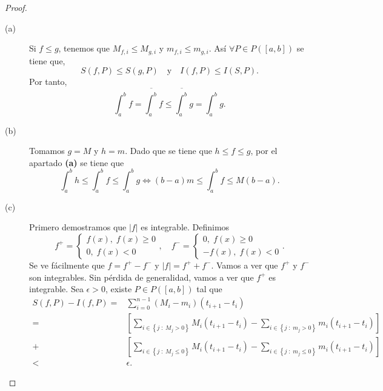\begin{proof}
\begin{description}
	\item[(a)] Si $\displaystyle f \leq g $, tenemos que $\displaystyle M_{f,i} \leq M_{g,i} $ y $\displaystyle m_{f,i} \leq m_{g,i} $. Así $\displaystyle \forall P \in P\left(\left[a,b\right] \right) $ se tiene que,
	\[ S\left(f,P\right) \leq S\left(g,P\right) \quad \text{y} \quad I\left(f,P\right) \leq I\left(S,P\right) .\]
	Por tanto, 
	\[ \int^{b}_{a} f = \overline{\int^{b}_{a}} f \leq \overline{\int^{b}_{a}} g = \int^{b}_{a} g  .\]
\item[(b)] Tomamos $\displaystyle g = M $ y $\displaystyle h = m $. Dado que se tiene que $\displaystyle h \leq f \leq g $, por el apartado \textbf{(a)} se tiene que 
	\[ \int^{b}_{a} h \leq \int^{b}_{a} f \leq \int^{b}_{a} g  \iff \left(b-a\right)m \leq \int^{b}_{a} f \leq M\left(b-a\right).\]
\item[(c)] Primero demostramos que $\displaystyle \left|f\right| $ es integrable. Definimos
	\[f^{+} = 
	\begin{cases}
	f\left(x\right), \; f\left(x\right) \geq 0 \\
	0, \; f\left(x\right) < 0
	\end{cases}
	, \quad f^{-} = 
\begin{cases}
0, \; f\left(x\right) \geq 0 \\
-f\left(x\right), \; f\left(x\right) < 0
\end{cases}
.\]
Se ve fácilmente que $\displaystyle f = f^{+} - f^{-} $ y $\displaystyle \left|f\right| = f^{+} + f^{-} $. Vamos a ver que $\displaystyle f^{+} $ y $\displaystyle f^{-} $ son integrables. Sin pérdida de generalidad, vamos a ver que $\displaystyle f^{+} $ es integrable. Sea $\displaystyle \epsilon > 0 $, existe $\displaystyle P \in P\left(\left[a,b\right] \right) $ tal que 
\[
\begin{split}
	S\left(f,P\right)-I\left(f,P\right) = & \sum^{n-1}_{i=0}\left(M_{i}-m_{i}\right)\left(t_{i+1}-t_{i}\right) \\
	= & \left[\sum^{}_{i \in \left\{ j \; : \; M_{j} > 0\right\}} M_{i}\left(t_{i+1}-t_{i}\right)-\sum^{}_{i \in \left\{ j \; : \; m_{j} > 0\right\} }m_{i}\left(t_{i+1}-t_{i}\right) \right] \\
	+ & \left[\sum^{}_{i \in \left\{ j \; : \; M_{j} \leq 0\right\}} M_{i}\left(t_{i+1}-t_{i}\right)-\sum^{}_{i \in \left\{ j \; : \; m_{j} \leq 0\right\} }m_{i}\left(t_{i+1}-t_{i}\right) \right] \\
	< & \epsilon .

\end{split}\]
\end{description}
\end{proof}
